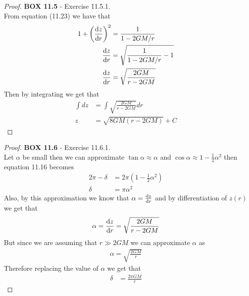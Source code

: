 \documentclass[11pt]{article}
\theoremstyle{definition}
\begin{document}
\cleardoublepage
\begin{proof}{\textbf{BOX 11.5} - Exercise 11.5.1.}\\
    From equation (11.23) we have that
    \begin{align*}
        1 + \left(\dv{z}{r}\right)^2 &= \frac{1}{1 - 2GM/r}\\
        \dv{z}{r} &= \sqrt{\frac{1}{1 - 2GM/r} - 1}\\
        \dv{z}{r} &= \sqrt{\frac{2GM}{r - 2GM}}
    \end{align*}
    Then by integrating we get that
    \begin{align*}
        \int dz &= \int \sqrt{\frac{2GM}{r - 2GM}} dr\\
        z &= \sqrt{8GM(r - 2GM)} + C
    \end{align*}
\end{proof}
\begin{proof}{\textbf{BOX 11.6} - Exercise 11.6.1.}\\
    Let $\alpha$ be small then we can approximate $\tan\alpha \approx \alpha$
    and $\cos\alpha \approx 1 - \frac{1}{2}\alpha^2$ then equation 11.16
    becomes
    \begin{align*}
        2\pi - \delta &= 2\pi \left(1 - \frac{1}{2}\alpha^2\right)\\
        \delta &= \pi\alpha^2
    \end{align*}
    Also, by this approximation we know that $\alpha = \dv{z}{r}$ and by
    differentiation of $z(r)$ we get that
    \begin{align*}
        \alpha = \dv{z}{r} = \sqrt{\frac{2GM}{r - 2GM}}
    \end{align*}
    But since we are assuming that $r \gg 2GM$ we can approximate $\alpha$ as   
    \begin{align*}
        \alpha = \sqrt{\frac{2GM}{r}}
    \end{align*}
    Therefore replacing the value of $\alpha$ we get that
    \begin{align*}
        \delta &= \frac{2\pi GM}{r}
    \end{align*}
\end{proof}
\cleardoublepage
\end{document}
